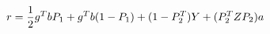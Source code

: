 \begin{equation}
r={1\over2} g\sp{T} b P_1+g\sp{T} b(1-P_1) +(1-P_2\sp{T})Y+ (P_2\sp{T}ZP_2)a
\label{gensoln}
\end{equation}

